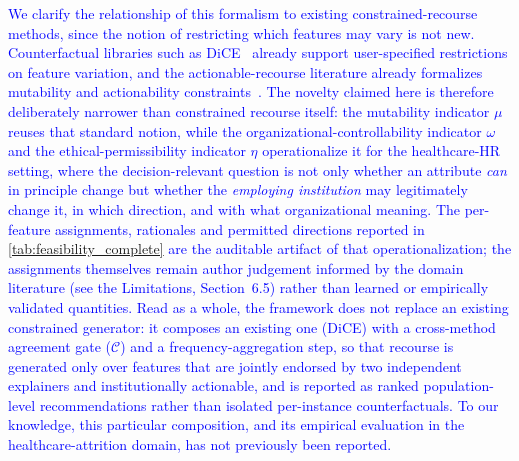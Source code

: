 \documentclass[a4paper,fleqn]{cas-sc}
\begin{document}
\textcolor{blue}{We clarify the relationship of this formalism to existing constrained-recourse methods, since the notion of restricting which features may vary is not new. Counterfactual libraries such as DiCE~\cite{mothilal2020dice} already support user-specified restrictions on feature variation, and the actionable-recourse literature already formalizes mutability and actionability constraints~\cite{ustun2019actionable,karimi2021algorithmic}. The novelty claimed here is therefore deliberately narrower than constrained recourse itself: the mutability indicator $\mu$ reuses that standard notion, while the organizational-controllability indicator $\omega$ and the ethical-permissibility indicator $\eta$ operationalize it for the healthcare-HR setting, where the decision-relevant question is not only whether an attribute \emph{can} in principle change but whether the \emph{employing institution} may legitimately change it, in which direction, and with what organizational meaning. The per-feature assignments, rationales and permitted directions reported in \cref{tab:feasibility_complete} are the auditable artifact of that operationalization; the assignments themselves remain author judgement informed by the domain literature (see the Limitations, Section~6.5) rather than learned or empirically validated quantities. Read as a whole, the framework does not replace an existing constrained generator: it composes an existing one (DiCE) with a cross-method agreement gate ($\mathcal{C}$) and a frequency-aggregation step, so that recourse is generated only over features that are jointly endorsed by two independent explainers and institutionally actionable, and is reported as ranked population-level recommendations rather than isolated per-instance counterfactuals. To our knowledge, this particular composition, and its empirical evaluation in the healthcare-attrition domain, has not previously been reported.}
\end{document}
